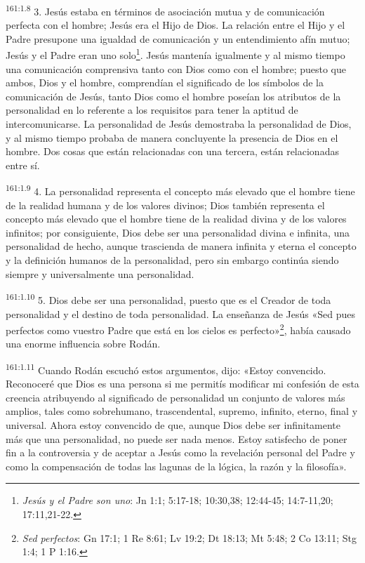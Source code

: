 \par
\textsuperscript{161:1.8} 3. Jesús estaba en términos de asociación mutua y de comunicación perfecta con el hombre; Jesús era el Hijo de Dios. La relación entre el Hijo y el Padre presupone una igualdad de comunicación y un entendimiento afín mutuo; Jesús y el Padre eran uno solo\footnote{\textit{Jesús y el Padre son uno}: Jn 1:1; 5:17-18; 10:30,38; 12:44-45; 14:7-11,20; 17:11,21-22.}. Jesús mantenía igualmente y al mismo tiempo una comunicación comprensiva tanto con Dios como con el hombre; puesto que ambos, Dios y el hombre, comprendían el significado de los símbolos de la comunicación de Jesús, tanto Dios como el hombre poseían los atributos de la personalidad en lo referente a los requisitos para tener la aptitud de intercomunicarse. La personalidad de Jesús demostraba la personalidad de Dios, y al mismo tiempo probaba de manera concluyente la presencia de Dios en el hombre. Dos cosas que están relacionadas con una tercera, están relacionadas entre sí.

\par
\textsuperscript{161:1.9} 4. La personalidad representa el concepto más elevado que el hombre tiene de la realidad humana y de los valores divinos; Dios también representa el concepto más elevado que el hombre tiene de la realidad divina y de los valores infinitos; por consiguiente, Dios debe ser una personalidad divina e infinita, una personalidad de hecho, aunque trascienda de manera infinita y eterna el concepto y la definición humanos de la personalidad, pero sin embargo continúa siendo siempre y universalmente una personalidad.

\par
\textsuperscript{161:1.10} 5. Dios debe ser una personalidad, puesto que es el Creador de toda personalidad y el destino de toda personalidad. La enseñanza de Jesús «Sed pues perfectos como vuestro Padre que está en los cielos es perfecto»\footnote{\textit{Sed perfectos}: Gn 17:1; 1 Re 8:61; Lv 19:2; Dt 18:13; Mt 5:48; 2 Co 13:11; Stg 1:4; 1 P 1:16.}, había causado una enorme influencia sobre Rodán.

\par
\textsuperscript{161:1.11} Cuando Rodán escuchó estos argumentos, dijo: «Estoy convencido. Reconoceré que Dios es una persona si me permitís modificar mi confesión de esta creencia atribuyendo al significado de personalidad un conjunto de valores más amplios, tales como sobrehumano, trascendental, supremo, infinito, eterno, final y universal. Ahora estoy convencido de que, aunque Dios debe ser infinitamente más que una personalidad, no puede ser nada menos. Estoy satisfecho de poner fin a la controversia y de aceptar a Jesús como la revelación personal del Padre y como la compensación de todas las lagunas de la lógica, la razón y la filosofía».

